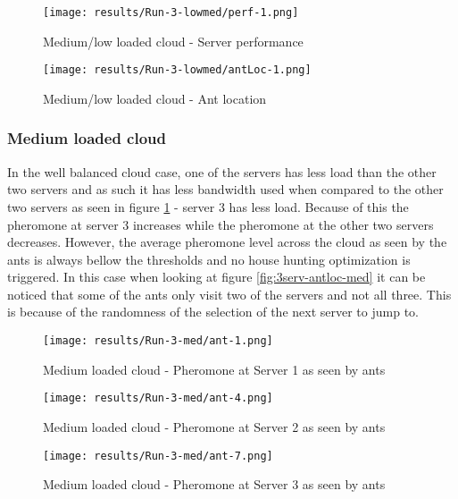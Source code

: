 \begin{figure}
	\centering
		\texttt{[image: results/Run-3-lowmed/perf-1.png]}
	\caption{Medium/low loaded cloud - Server performance}
	\label{fig:3serv-perf-lowmed}
\end{figure}

\begin{figure}
	\centering
		\texttt{[image: results/Run-3-lowmed/antLoc-1.png]}
	\caption{Medium/low loaded cloud - Ant location}
	\label{fig:3serv-antloc-lowmed}
\end{figure}

\subsubsection{Medium loaded cloud}

In the well balanced cloud case, one of the servers has less load than the other two servers and as such it has less bandwidth used when compared to the other two servers as seen in figure \ref{fig:3serv-perf-lowmed} - server 3 has less load. Because of this the pheromone at server 3 increases while the pheromone at the other two servers decreases. However, the average pheromone level across the cloud as seen by the ants is always bellow the thresholds and no house hunting optimization is triggered. In this case when looking at figure \ref{fig:3serv-antloc-med} it can be noticed that some of the ants only visit two of the servers and not all three. This is because of the randomness of the selection of the next server to jump to.

\begin{figure}[!ht]
	\centering
		\texttt{[image: results/Run-3-med/ant-1.png]}
	\caption{Medium loaded cloud - Pheromone at Server 1 as seen by ants}
	\label{fig:3serv-ant1-med}
\end{figure}

\begin{figure}
	\centering
		\texttt{[image: results/Run-3-med/ant-4.png]}
	\caption{Medium loaded cloud - Pheromone at Server 2 as seen by ants}
	\label{fig:3serv-ant4-med}
\end{figure}

\begin{figure}
	\centering
		\texttt{[image: results/Run-3-med/ant-7.png]}
	\caption{Medium loaded cloud - Pheromone at Server 3 as seen by ants}
	\label{fig:3serv-ant7-med}
\end{figure}

